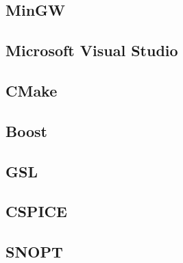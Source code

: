 \documentclass[11pt]{article}
\begin{document}


\subsection{MinGW}
\label{sec:mingw}



\subsection{Microsoft Visual Studio}
\label{sec:visual_studio}



\subsection{CMake}
\label{sec:cmake}



\subsection{Boost}
\label{sec:boost}



\subsection{GSL}
\label{sec:gsl}



\subsection{CSPICE}
\label{sec:cspice}



\subsection{SNOPT}
\label{sec:snopt}
\end{document}
